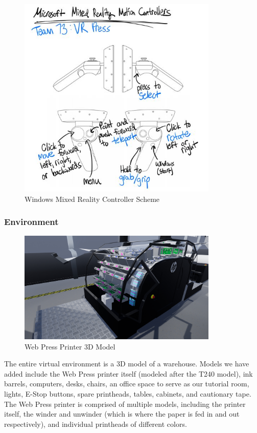 \documentclass[onecolumn, draftclsnofoot,10pt, compsoc]{IEEEtran}
\begin{document}
\begin{figure}[ht!]
    \centering
    \includegraphics[width=0.85\textwidth]{VRPressInfographic.JPG}
    \caption{Windows Mixed Reality Controller Scheme}
    \label{fig:controllers}
\end{figure}


\subsubsection{Environment}

\begin{figure}[ht!]
    \centering
    \includegraphics[width=0.85\textwidth]{press1.png}
    \caption{Web Press Printer 3D Model}
    \label{fig:printerModel}
\end{figure}

The entire virtual environment is a 3D model of a warehouse. Models we have added include the Web Press printer itself (modeled after the T240 model), ink barrels, computers, desks, chairs, an office space to serve as our tutorial room, lights, E-Stop buttons, spare printheads, tables, cabinets, and cautionary tape. The Web Press printer is comprised of multiple models, including the printer itself, the winder and unwinder (which is where the paper is fed in and out respectively), and individual printheads of different colors. 
\end{document}
